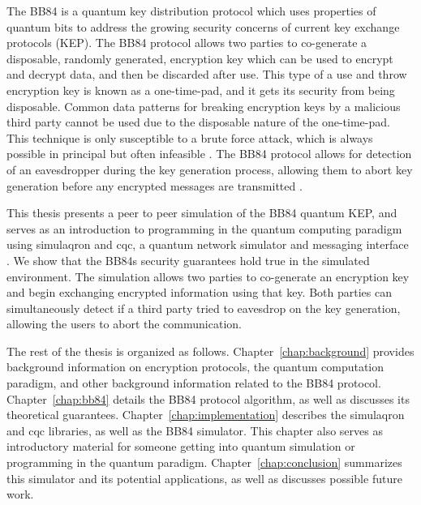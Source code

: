 The BB84 is a quantum key distribution protocol which uses properties of quantum bits to address the growing security concerns of current key exchange protocols (KEP).
The BB84 protocol allows two parties to co-generate a disposable, randomly generated, encryption key which can be used to encrypt and decrypt data, and then be discarded after use.
This type of a use and throw encryption key is known as a one-time-pad, and it gets its security from being disposable.
Common data patterns for breaking encryption keys by a malicious third party cannot be used due to the disposable nature of the one-time-pad.
This technique is only susceptible to a brute force attack, which is always possible in principal but often infeasible \cite{cryptography}.
The BB84 protocol allows for detection of an eavesdropper during the key generation process, allowing them to abort key generation before any encrypted messages are transmitted \cite{qcftgu}.

This thesis presents a peer to peer simulation of the BB84 quantum KEP, and serves as an introduction to programming in the quantum computing paradigm using simulaqron and cqc, a quantum network simulator and messaging interface \cite{simulaqron}.
We show that the BB84s security guarantees hold true in the simulated environment.
The simulation allows two parties to co-generate an encryption key and begin exchanging encrypted information using that key.
Both parties can simultaneously detect if a third party tried to eavesdrop on the key generation, allowing the users to abort the communication. 

The rest of the thesis is organized as follows.
Chapter~\ref{chap:background} provides background information on encryption protocols, the quantum computation paradigm, and other background information related to the BB84 protocol. 
Chapter~\ref{chap:bb84} details the BB84 protocol algorithm, as well as discusses its theoretical guarantees.
Chapter~\ref{chap:implementation} describes the simulaqron and cqc libraries, as well as the BB84 simulator.
This chapter also serves as introductory material for someone getting into quantum simulation or programming in the quantum paradigm.
Chapter~\ref{chap:conclusion} summarizes this simulator and its potential applications, as well as discusses possible future work.

